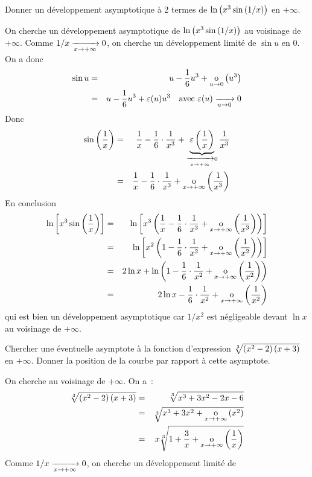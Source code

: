 \documentclass{magnolia}
\begin{document}
\begin{exos}
\exo Donner un développement asymptotique à 2 termes de $\ln\left(x^3\sin\left(1/x\right)\right)$ en $+\infty$.
  \begin{sol}
  On cherche un développement asymptotique de $\ln\left(x^3\sin\left(1/x\right)\right)$
  au voisinage de $+\infty$. Comme $1/x\xrightarrow[x\rightarrow +\infty]{}0$, on
  cherche un développement limité de $\sin u$ en 0. On a donc
  \begin{eqnarray*}
  \sin u
  &=& u-\frac{1}{6}u^3+\underset{u \rightarrow 0}{\text{o}}\left(u^3\right)\\
  &=& u-\frac{1}{6}u^3+\varepsilon(u)u^3
      \quad \text{avec $\varepsilon(u)\xrightarrow[u\rightarrow 0]{}0$}
  \end{eqnarray*}
  Donc
  \begin{eqnarray*}
  \sin\left(\frac{1}{x}\right)
  &=& \frac{1}{x}-\frac{1}{6}\cdot\frac{1}{x^3}+
      \underbrace{\varepsilon\left(\frac{1}{x}\right)}_{\xrightarrow[x\rightarrow +\infty]{}0}\frac{1}{x^3}\\
  &=& \frac{1}{x}-\frac{1}{6}\cdot\frac{1}{x^3}+\underset{x \rightarrow +\infty}{\text{o}}\left(\frac{1}{x^3}\right)
  \end{eqnarray*}
  En conclusion
  \begin{eqnarray*}
  \ln\cro{x^3\sin\p{\frac{1}{x}}}
  &=& \ln\cro{x^3\p{\frac{1}{x}-\frac{1}{6}\cdot\frac{1}{x^3}+%
      \petitoinfty{x}{\frac{1}{x^3}}}}\\
  &=& \ln\cro{x^2\p{1-\frac{1}{6}\cdot\frac{1}{x^2}+%
      \petitoinfty{x}{\frac{1}{x^2}}}}\\
  &=& 2\ln x+\ln\p{1-\frac{1}{6}\cdot\frac{1}{x^2}+%
      \petitoinfty{x}{\frac{1}{x^2}}}\\
  &=& 2\ln x-\frac{1}{6}\cdot\frac{1}{x^2}+\petitoinfty{x}{\frac{1}{x^2}}
  \end{eqnarray*}
  qui est bien un développement asymptotique car $1/x^2$ est négligeable devant
  $\ln x$ au voisinage de $+\infty$.    
  \end{sol}
\exo Chercher une éventuelle asymptote à la fonction d'expression
  $\sqrt[3]{\left(x^2-2\right)\left(x+3\right)}$ en $+\infty$. Donner la position de la courbe par
  rapport à cette asymptote.
  \begin{sol}
  On cherche 
  au voisinage de $+\infty$. On a~:
  \begin{eqnarray*}
  \sqrt[3]{\left(x^2-2\right)\left(x+3\right)}
  &=& \sqrt[3]{x^3+3x^2-2x-6}\\
  &=& \sqrt[3]{x^3+3x^2+\underset{x \rightarrow +\infty}{\text{o}}\left(x^2\right)}\\
  &=& x\sqrt[3]{1+\frac{3}{x}+\underset{x \rightarrow +\infty}{\text{o}}\left(\frac{1}{x}\right)}
  \end{eqnarray*}
  Comme $1/x\xrightarrow[x\rightarrow +\infty]{}0$, on cherche un développement limité de

\end{sol}
\end{exos}
\end{document}
